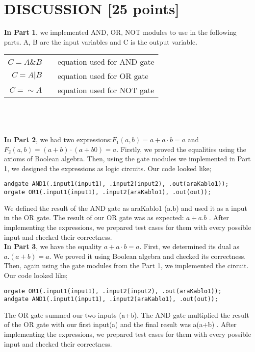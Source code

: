 \documentclass[pdftex,12pt,a4paper]{article}
\begin{document}
\section{DISCUSSION [25 points]}
\textbf{In Part 1}, we implemented AND, OR, NOT modules to use in the following parts. A, B are the input variables and C is the output variable.\\

\begin{tabular}{rcl}
\(C = A \& B\) & & equation used for AND gate\\
\(C = A | B\)  & & equation used for OR gate\\
\(C = \sim A\) & & equation used for NOT gate\\
\end{tabular}\\
\\
\\
\textbf{In Part 2}, we had two expressions:\(F_1(a, b) = a + a · b = a \) and \( F_2(a, b) = (a + b) · (a + b 0 ) = a\). Firstly, we proved the equalities using the axioms of Boolean algebra. Then, using the gate modules we implemented in Part 1, we designed the expressions as logic circuits. Our code looked like;


\begin{verbatim}
andgate AND1(.input1(input1), .input2(input2), .out(araKablo1));
orgate OR1(.input1(input1), .input2(araKablo1), .out(out));
\end{verbatim}

We defined the result of the AND gate as araKablo1 (a.b) and used it as a input in the OR gate. The result of our OR gate was as expected: \(a+a.b\) . After implementing the expressions, we prepared test cases for them with every possible input and checked their correctness.\\

\textbf{In Part 3}, we have the equality \(a + a · b = a\). First, we determined its dual as \(a . (a + b) = a\). We proved it using Boolean algebra and checked its correctness. Then, again using the gate modules from the Part 1, we implemented the circuit. Our code looked like; 

\begin{verbatim}
orgate OR1(.input1(input1), .input2(input2), .out(araKablo1)); 
andgate AND1(.input1(input1), .input2(araKablo1), .out(out)); 
\end{verbatim}

The OR gate summed our two inputs (a+b). The AND gate multiplied the result of the OR gate with our first input(a) and the final result was a(a+b) . After implementing the expressions, we prepared test cases for them with every possible input and checked their correctness.\\
\end{document}

